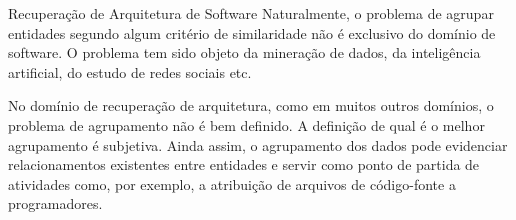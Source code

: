 \begin{section}{Recuperação de Arquitetura de Software}
Naturalmente, o problema de agrupar entidades segundo algum critério de similaridade não é exclusivo do domínio de software. O problema tem sido objeto da mineração de dados, da inteligência artificial, do estudo de redes sociais etc. %

No domínio de recuperação de arquitetura, como em muitos outros domínios, o problema de agrupamento não é bem definido. A definição de qual é o melhor agrupamento é subjetiva. Ainda assim, o agrupamento dos dados pode evidenciar relacionamentos existentes entre entidades e servir como ponto de partida de atividades como, por exemplo, a atribuição de arquivos de código-fonte a programadores.



\end{section}

